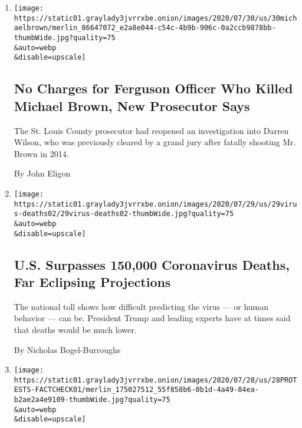 \begin{enumerate}
\def\labelenumi{\arabic{enumi}.}
\item
  \href{/2020/07/30/us/michael-brown-darren-wilson-ferguson.html}{}

  \texttt{[image: https://static01.graylady3jvrrxbe.onion/images/2020/07/30/us/30michaelbrown/merlin\_86647072\_e2a8e044-c54c-4b9b-906c-0a2ccb9878bb-thumbWide.jpg?quality=75\\\&auto=webp\\\&disable=upscale]}

  \hypertarget{no-charges-for-ferguson-officer-who-killed-michael-brown-new-prosecutor-says}{%
  \subsection{No Charges for Ferguson Officer Who Killed Michael Brown,
  New Prosecutor
  Says}\label{no-charges-for-ferguson-officer-who-killed-michael-brown-new-prosecutor-says}}

  The St. Louis County prosecutor had reopened an investigation into
  Darren Wilson, who was previously cleared by a grand jury after
  fatally shooting Mr. Brown in 2014.

  By John Eligon
\item
  \href{/2020/07/29/us/coronavirus-deaths-150000.html}{}

  \texttt{[image: https://static01.graylady3jvrrxbe.onion/images/2020/07/29/us/29virus-deaths02/29virus-deaths02-thumbWide.jpg?quality=75\\\&auto=webp\\\&disable=upscale]}

  \hypertarget{us-surpasses-150000-coronavirus-deaths-far-eclipsing-projections}{%
  \subsection{U.S. Surpasses 150,000 Coronavirus Deaths, Far Eclipsing
  Projections}\label{us-surpasses-150000-coronavirus-deaths-far-eclipsing-projections}}

  The national toll shows how difficult predicting the virus --- or
  human behavior --- can be. President Trump and leading experts have at
  times said that deaths would be much lower.

  By Nicholas Bogel-Burroughs
\item
  \href{/2020/07/28/us/portland-protests-fact-check.html}{}

  \texttt{[image: https://static01.graylady3jvrrxbe.onion/images/2020/07/28/us/28PROTESTS-FACTCHECK01/merlin\_175027512\_55f858b6-0b1d-4a49-84ea-b2ae2a4e9109-thumbWide.jpg?quality=75\\\&auto=webp\\\&disable=upscale]}


\end{enumerate}
